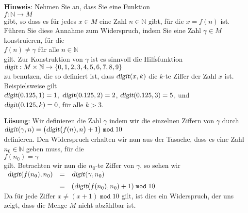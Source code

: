 \documentclass{article}
\newcommand{\solution}{
\vspace*{0.3cm}

\noindent
\textbf{L\"osung}: }
\begin{document}
\noindent
\textbf{Hinweis}: Nehmen Sie an, dass Sie eine Funktion
\\[0.2cm]
\hspace*{1.3cm}
$f: \mathbb{N} \rightarrow M$
\\[0.2cm]
gibt, so dass es f\"ur jedes $x \in M$ eine Zahl $n \in \mathbb{N}$ gibt, f\"ur die
$x = f(n)$ ist.  F\"uhren Sie diese Annahme zum Widerspruch, indem Sie eine Zahl 
$\gamma \in M$ konstruieren, f\"ur die 
\\[0.2cm]
\hspace*{1.3cm}
$f(n) \not= \gamma$ \quad f\"ur alle $n \in \mathbb{N}$
\\[0.2cm]
gilt.  Zur Konstruktion von $\gamma$ ist es sinnvoll die Hilfsfunktion
\\[0.2cm]
\hspace*{1.3cm}
$\textsl{digit}: M \times \mathbb{N} \rightarrow \{ 0, 1, 2, 3, 4, 5, 6,7, 8, 9\}$
\\[0.2cm]
zu benutzen, die so definiert ist, dass
$\textsl{digit}(x,k)$
die $k$-te Ziffer der Zahl $x$ ist.  Beispielsweise gilt
\\[0.2cm]
\hspace*{1.3cm}
$\textsl{digit}(0.125, 1) = 1$, \quad
$\textsl{digit}(0.125, 2) = 2$, \quad
$\textsl{digit}(0.125, 3) = 5$, \quad und 
\\[0.2cm]
\hspace*{1.3cm}
$\textsl{digit}(0.125, k) = 0$, \quad f\"ur alle $k > 3$.

\solution
Wir definieren die Zahl $\gamma$ indem wir die einzelnen Ziffern von $\gamma$ durch
\\[0.2cm]
\hspace*{1.3cm}
$\textsl{digit}(\gamma,n) = \bigl(\textsl{digit}\bigl(f(n),n\bigr) + 1\bigr) \;\mathtt{mod}\; 10$
\\[0.2cm]
definieren.  Den Widerspruch erhalten wir nun aus der Tasache, dass es eine Zahl $n_0 \in \mathbb{N}$ geben 
muss, f\"ur die
\\[0.2cm]
\hspace*{1.3cm}
$f(n_0) = \gamma$
\\[0.2cm]
gilt.  Betrachten wir nun die $n_0$-te Ziffer von $\gamma$, so sehen wir
\\[0.2cm]
\hspace*{1.3cm}
$
\begin{array}[t]{lcl}
\textsl{digit}(f(n_0), n_0) & = & \textsl{digit}(\gamma, n_0)                          \\[0.2cm]
                            & = & (\textsl{digit}(f(n_0),n_0) + 1) \;\mathtt{mod}\; 10. 
\end{array}
$
\\[0.2cm]
Da f\"ur jede Ziffer $x \not= (x + 1) \;\mathtt{mod}\; 10$ gilt, ist dies ein Widerspruch, der uns zeigt,
dass die Menge $M$ nicht abz\"ahlbar ist.
\vspace{0.3cm}
\end{document}
